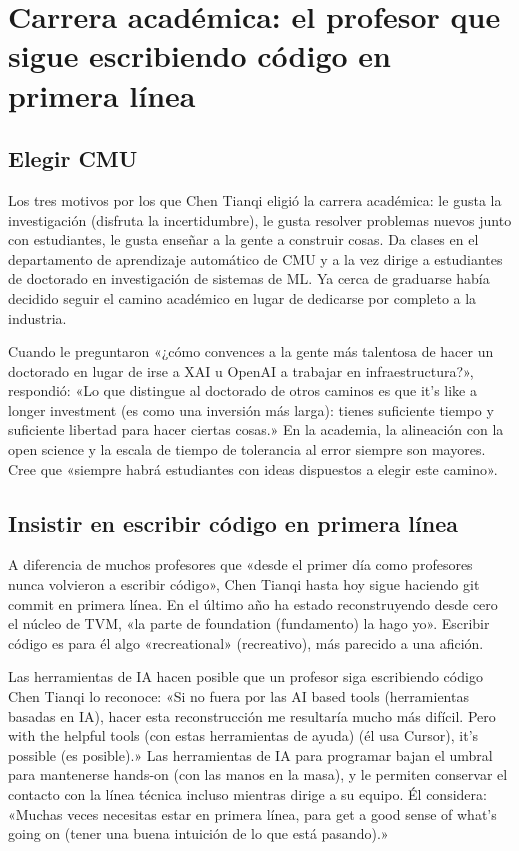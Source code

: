 \documentclass[a4paper]{article}
\begin{document}
\section{Carrera académica: el profesor que sigue escribiendo código en primera línea}

\subsection{Elegir CMU}

Los tres motivos por los que Chen Tianqi eligió la carrera académica: le gusta la investigación (disfruta la incertidumbre), le gusta resolver problemas nuevos junto con estudiantes, le gusta enseñar a la gente a construir cosas. Da clases en el departamento de aprendizaje automático de CMU y a la vez dirige a estudiantes de doctorado en investigación de sistemas de ML. Ya cerca de graduarse había decidido seguir el camino académico en lugar de dedicarse por completo a la industria.

Cuando le preguntaron «¿cómo convences a la gente más talentosa de hacer un doctorado en lugar de irse a XAI u OpenAI a trabajar en infraestructura?», respondió: «Lo que distingue al doctorado de otros caminos es que it's like a longer investment (es como una inversión más larga): tienes suficiente tiempo y suficiente libertad para hacer ciertas cosas.» En la academia, la alineación con la open science y la escala de tiempo de tolerancia al error siempre son mayores. Cree que «siempre habrá estudiantes con ideas dispuestos a elegir este camino».

\subsection{Insistir en escribir código en primera línea}

A diferencia de muchos profesores que «desde el primer día como profesores nunca volvieron a escribir código», Chen Tianqi hasta hoy sigue haciendo git commit en primera línea. En el último año ha estado reconstruyendo desde cero el núcleo de TVM, «la parte de foundation (fundamento) la hago yo». Escribir código es para él algo «recreational» (recreativo), más parecido a una afición.

\begin{knowledgebox}{Las herramientas de IA hacen posible que un profesor siga escribiendo código}
Chen Tianqi lo reconoce: «Si no fuera por las AI based tools (herramientas basadas en IA), hacer esta reconstrucción me resultaría mucho más difícil. Pero with the helpful tools (con estas herramientas de ayuda) (él usa Cursor), it's possible (es posible).» Las herramientas de IA para programar bajan el umbral para mantenerse hands-on (con las manos en la masa), y le permiten conservar el contacto con la línea técnica incluso mientras dirige a su equipo. Él considera: «Muchas veces necesitas estar en primera línea, para get a good sense of what's going on (tener una buena intuición de lo que está pasando).»
\end{knowledgebox}
\end{document}
